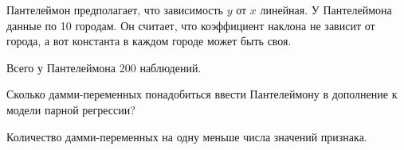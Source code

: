 
\begin{question}
Пантелеймон предполагает, что зависимость \(y\) от \(x\) линейная.
У Пантелеймона данные по 10 городам.
Он считает, что коэффициент наклона не зависит от города,
а вот константа в каждом городе может быть своя.

Всего у Пантелеймона 200 наблюдений.

Сколько дамми-переменных понадобиться ввести Пантелеймону в дополнение к модели парной регрессии?
\end{question}

\begin{solution}
Количество дамми-переменных на одну меньше числа значений признака.
\end{solution}

